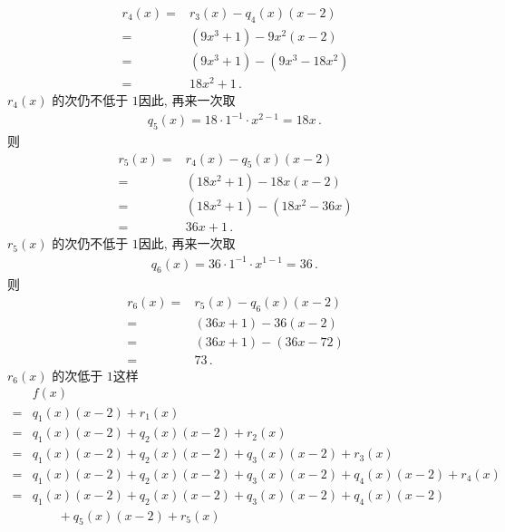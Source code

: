 \begin{example}
\begin{align*}
        r_4 (x)
        = {} & r_3 (x) - q_4 (x) (x - 2)   \\
        = {} & (9x^3 + 1) - 9x^2 (x - 2)   \\
        = {} & (9x^3 + 1) - (9x^3 - 18x^2) \\
        = {} & 18x^2 + 1 \period
    \end{align*}
    $r_4 (x)$ 的次仍不低于 $1$\period 因此, 再来一次\period 取
    \begin{align*}
        q_5 (x) = 18 \cdot 1^{-1} \cdot x^{2-1} = 18x \period
    \end{align*}
    则
    \begin{align*}
        r_5 (x)
        = {} & r_4 (x) - q_5 (x) (x - 2)   \\
        = {} & (18x^2 + 1) - 18x (x - 2)   \\
        = {} & (18x^2 + 1) - (18x^2 - 36x) \\
        = {} & 36x + 1 \period
    \end{align*}
    $r_5 (x)$ 的次仍不低于 $1$\period 因此, 再来一次\period 取
    \begin{align*}
        q_6 (x) = 36 \cdot 1^{-1} \cdot x^{1-1} = 36 \period
    \end{align*}
    则
    \begin{align*}
        r_6 (x)
        = {} & r_5 (x) - q_6 (x) (x - 2) \\
        = {} & (36x + 1) - 36 (x - 2)    \\
        = {} & (36x + 1) - (36x - 72)    \\
        = {} & 73 \period
    \end{align*}
    $r_6 (x)$ 的次低于 $1$\period 这样
    \begin{align*}
             & f(x)                                                                        \\
        = {} & q_1 (x) (x-2) + r_1 (x)                                                     \\
        = {} & q_1 (x) (x-2) + q_2 (x) (x-2) + r_2 (x)                                     \\
        = {} & q_1 (x) (x-2) + q_2 (x) (x-2) + q_3 (x) (x-2) + r_3 (x)                     \\
        = {} & q_1 (x) (x-2) + q_2 (x) (x-2) + q_3 (x) (x-2) + q_4 (x) (x-2) + r_4 (x)     \\
        = {} & q_1 (x) (x-2) + q_2 (x) (x-2) + q_3 (x) (x-2) + q_4 (x) (x-2)               \\
             & \qquad + q_5 (x) (x-2) + r_5 (x)                                            \\

\end{align*}
\end{example}

